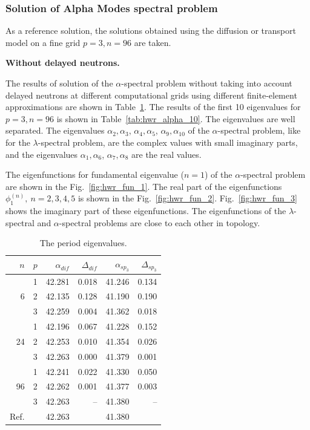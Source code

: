 \documentclass[authoryear]{elsarticle}
\begin{document}
\subsubsection{Solution of Alpha Modes spectral problem}
As a reference solution, the solutions obtained using the diffusion or transport model on a fine grid $ p = 3, n = 96 $ are taken.

\textbf{Without delayed neutrons.}

The results of solution of the $\alpha$-spectral problem without taking into account delayed neutrons at different computational grids using different finite-element approximations are shown in Table~\ref{tab:hwr_alpha}. 
The results of the first 10 eigenvalues for $p = 3, n = 96 $ is shown in Table~\ref{tab:hwr_alpha_10}.
The eigenvalues are well separated.
The eigenvalues $\alpha_2, \alpha_3$, $\alpha_4, \alpha_5$, $\alpha_9, \alpha_{10}$ of the $\alpha$-spectral problem, like for the $\lambda$-spectral problem, are the complex values with small imaginary parts, and the eigenvalues $\alpha_1, \alpha_6$, $\alpha_7, \alpha_8$ are the real values.

The eigenfunctions for fundamental eigenvalue ($n=1$) of the $\alpha$-spectral problem  are shown in the Fig.~\ref{fig:hwr_fun_1}.
The real part of the eigenfunctions $\phi^{(n)}_1, \ n = 2,3,4,5$ is shown in the Fig.~\ref{fig:hwr_fun_2}.
Fig.~\ref{fig:hwr_fun_3} shows the imaginary part of these eigenfunctions.
The eigenfunctions of the $\lambda$-spectral and $\alpha$-spectral problems are close to each other in topology.

\begin{table}[h]
\caption{The period eigenvalues.}
\label{tab:hwr_alpha}
\begin{center}
\begin{tabular}{rrrrrr}
\hline
$n$ & $p$ & $\alpha_{dif}$ & $\Delta_{dif}$ &$\alpha_{sp_3}$& $\Delta_{sp_3}$ \\
\hline
	& 1	&42.281 & 0.018 & 41.246 & 0.134\\
6	& 2	&42.135 & 0.128 & 41.190 & 0.190\\
	& 3	&42.259 & 0.004 & 41.362 & 0.018\\ 
\hline
	& 1	&42.196 & 0.067 & 41.228 & 0.152\\
24& 2	&42.253 & 0.010 & 41.354 & 0.026\\
	& 3	&42.263 & 0.000 & 41.379 & 0.001\\ 
\hline
	& 1	&42.241 & 0.022 & 41.330 & 0.050\\
96& 2	&42.262 & 0.001 & 41.377 & 0.003\\
	& 3	&42.263 &    -- & 41.380 & -- \\ 
\hline
Ref.& & 42.263 & & 41.380 \\ 
\hline
\end{tabular}
\end{center}
\end{table}
\end{document}
